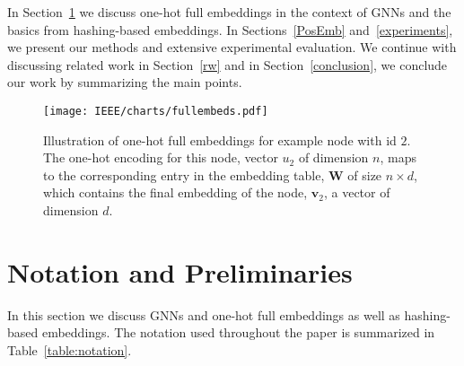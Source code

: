 \documentclass[conference]{IEEEtran}
\begin{document}
In Section~\ref{sec:notation} we discuss one-hot full embeddings in the context of GNNs and the basics from hashing-based embeddings. In Sections~\ref{PosEmb} and~\ref{experiments}, we present our methods and extensive experimental evaluation. We continue with discussing related work in Section~\ref{rw} and in Section~\ref{conclusion}, we conclude our work by summarizing the main points.

\begin{figure}[!t]
\centerline{\texttt{[image: IEEE/charts/fullembeds.pdf]}}
\caption{Illustration of one-hot full embeddings for example node with id $2$. The one-hot encoding for this node, vector $u_2$ of dimension $n$, maps to the corresponding entry in the embedding table, $\mathbf{W}$ of size $n\times d$, which contains the final embedding of the node, $\mathbf{v}_2$, a vector of dimension $d$.}
\label{fig:fullembeds}
\end{figure}

\section{Notation and Preliminaries}
\label{sec:notation}
In this section we discuss GNNs and one-hot full embeddings as well as hashing-based embeddings. The notation used throughout the paper is summarized in Table~\ref{table:notation}. 
\end{document}
